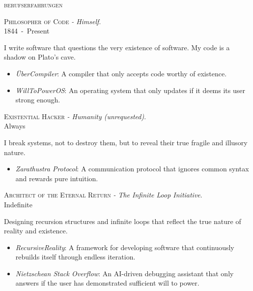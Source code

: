 \documentclass[11pt, a4paper]{article}
\newcommand{\dates}[1]{\hfill\mbox{#1}} %
\newcommand{\headright}[1]{\vspace*{2.5ex}\textsc{\Large\color{cvblue}#1}\par%
     \vspace*{-2ex}{\color{cvblue}\hrulefill}\par}
\begin{document}
\begin{minipage}[t]{0.782\textwidth}
\headright{berufserfahrungen}
\textsc{Philosopher of Code} \textit{ - Himself}.\\ \dates{1844 - Present}\vspace{0.5em}\\
	\hspace*{0.5em}\begin{minipage}[t]{\dimexpr\textwidth-2em\relax}I write software that questions the very existence of software. My code is a shadow on Plato’s cave.\end{minipage}
\begin{itemize}
	\item \textit{ÜberCompiler}: A compiler that only accepts code worthy of existence.
	\item \textit{WillToPowerOS}: An operating system that only updates if it deems its user strong enough.
\end{itemize}
\textsc{Existential Hacker} \textit{ - Humanity (unrequested)}.\\ \dates{Always}\vspace{0.5em}\\
	\hspace*{0.5em}\begin{minipage}[t]{\dimexpr\textwidth-2em\relax}I break systems, not to destroy them, but to reveal their true fragile and illusory nature.\end{minipage}
\begin{itemize}
	\item \textit{Zarathustra Protocol}: A communication protocol that ignores common syntax and rewards pure intuition.
\end{itemize}
\textsc{Architect of the Eternal Return} \textit{ - The Infinite Loop Initiative}.\\ \dates{Indefinite}\vspace{0.5em}\\
	\hspace*{0.5em}\begin{minipage}[t]{\dimexpr\textwidth-2em\relax}Designing recursion structures and infinite loops that reflect the true nature of reality and existence.\end{minipage}
\begin{itemize}
	\item \textit{RecursiveReality}: A framework for developing software that continuously rebuilds itself through endless iteration.
	\item \textit{Nietzschean Stack Overflow}: An AI-driven debugging assistant that only answers if the user has demonstrated sufficient will to power.
\end{itemize}



\end{minipage}
\end{document}
